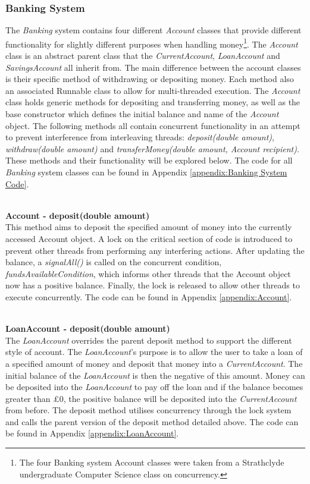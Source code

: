 \documentclass[a4paper,12pt]{article}
\begin{document}
\subsubsection{Banking System}

The \textit{Banking} system contains four different \textit{Account} classes that provide different functionality for slightly different purposes when handling money\footnote{The four Banking system Account classes were taken from a Strathclyde undergraduate Computer Science class on concurrency.}. The \textit{Account} class is an abstract parent class that the \textit{CurrentAccount}, \textit{LoanAccount} and \textit{SavingsAccount} all inherit from. The main difference between the account classes is their specific method of withdrawing or depositing money. Each method also an associated Runnable class to allow for multi-threaded execution. The \textit{Account} class holds generic methods for depositing and transferring money, as well as the base constructor which defines the initial balance and name of the \textit{Account} object. The following methods all contain concurrent functionality in an attempt to prevent interference from interleaving threads:  \textit{deposit(double amount)}, \textit{withdraw(double amount)} and \textit{transferMoney(double amount, Account recipient)}. These methods and their functionality will be explored below. The code for all \textit{Banking} system classes can be found in Appendix \ref{appendix:Banking System Code}. 

\textbf{\\Account - deposit(double amount)}
\\This method aims to deposit the specified amount of money into the currently accessed Account object. A lock on the critical section of code is introduced to prevent other threads from performing any interfering actions. After updating the balance, a \textit{signalAll()} is called on the  concurrent condition, \textit{fundsAvailableCondition}, which informs other threads that the Account object now has a positive balance. Finally, the lock is released to allow other threads to execute concurrently. The code can be found in Appendix \ref{appendix:Account}. 

\textbf{\\LoanAccount - deposit(double amount)}
\\The \textit{LoanAccount} overrides the parent deposit method to support the different style of account. The \textit{LoanAccount}'s purpose is to allow the user to take a loan of a specified amount of money and deposit that money into a \textit{CurrentAccount}. The initial balance of the \textit{LoanAccount} is then the negative of this amount. Money can be deposited into the \textit{LoanAccount} to pay off the loan and if the balance becomes greater than £0, the positive balance will be deposited into the \textit{CurrentAccount} from before. The deposit method utilises concurrency through the lock system and calls the parent version of the deposit method detailed above. The code can be found in Appendix \ref{appendix:LoanAccount}.  
\end{document}

